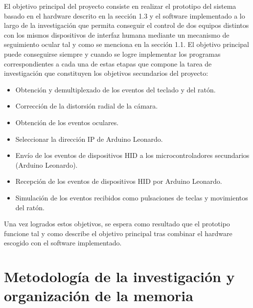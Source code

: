 El objetivo principal del proyecto consiste en realizar el prototipo del sistema basado en el hardware descrito en la sección 1.3 y el software implementado a lo largo de la investigación que permita conseguir el control de dos equipos distintos con los mismos dispositivos de interfaz humana mediante un mecanismo de seguimiento ocular tal y como se menciona en la sección 1.1. 
El objetivo principal puede conseguirse siempre y cuando se logre implementar los programas correspondientes a cada una de estas etapas que compone la tarea de investigación que constituyen los objetivos secundarios del proyecto:
\begin{itemize}
    \item Obtención y demultiplexado de los eventos del teclado y del ratón.
    \item Corrección de la distorsión radial de la cámara.
    \item Obtención de los eventos oculares.
    \item Seleccionar la dirección IP de Arduino Leonardo.
    \item Envío de los eventos de dispositivos HID a los microcontroladores secundarios (Arduino Leonardo).
    \item Recepción de los eventos de dispositivos HID por Arduino Leonardo.
    \item Simulación de los eventos recibidos como pulsaciones de teclas y movimientos del ratón.

\end{itemize}

Una vez logrados estos objetivos, se espera como resultado que el prototipo funcione tal y como describe el objetivo principal tras combinar el hardware escogido con el software implementado.
\clearpage
\section{Metodología de la investigación y organización de la memoria} \label{s1_5}

